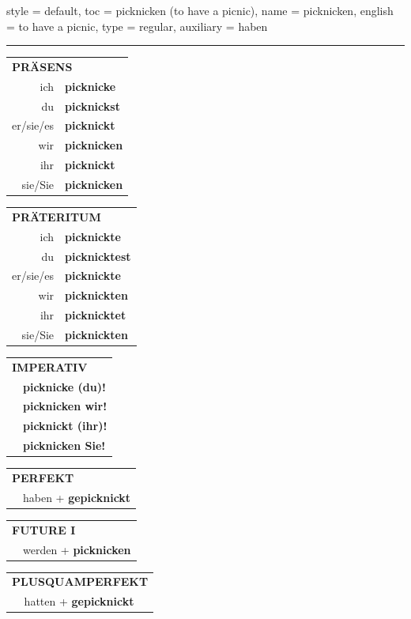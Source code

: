 \begin{verbentry}{
  style = {default},
  toc = {picknicken (to have a picnic)},
  name = {picknicken},
  english = {to have a picnic},
  type = {regular},
  auxiliary = {haben}
}


\vspace{5pt}
\hrule
\vspace{5pt}

\begin{tabular}{rl}
\multicolumn{2}{l}{\textbf{PRÄSENS}}\\
ich & \textbf{picknicke}\\
du & \textbf{picknickst}\\
er/sie/es & \textbf{picknickt}\\
wir & \textbf{picknicken}\\
ihr & \textbf{picknickt}\\
sie/Sie & \textbf{picknicken}\\
\end{tabular}
\hfill
\begin{tabular}{rl}
\multicolumn{2}{l}{\textbf{PRÄTERITUM}}\\
ich & \textbf{picknickte}\\
du & \textbf{picknicktest}\\
er/sie/es & \textbf{picknickte}\\
wir & \textbf{picknickten}\\
ihr & \textbf{picknicktet}\\
sie/Sie & \textbf{picknickten}\\
\end{tabular}
\hfill
\begin{tabular}{rl}
\multicolumn{2}{l}{\textbf{IMPERATIV}}\\
& \textbf{picknicke (du)!}\\
& \textbf{picknicken wir!}\\
& \textbf{picknickt (ihr)!}\\
& \textbf{picknicken Sie!}\\
\end{tabular}

\vspace{10pt}

\begin{tabular}{rl}
\multicolumn{2}{l}{\textbf{PERFEKT}}\\
& haben + \textbf{gepicknickt}\\
\end{tabular}
\hfill
\begin{tabular}{rl}
\multicolumn{2}{l}{\textbf{FUTURE I}}\\
& werden + \textbf{picknicken}\\
\end{tabular}
\hfill
\begin{tabular}{rl}
\multicolumn{2}{l}{\textbf{PLUSQUAMPERFEKT}}\\
& hatten + \textbf{gepicknickt}\\
\end{tabular}


\end{verbentry}

